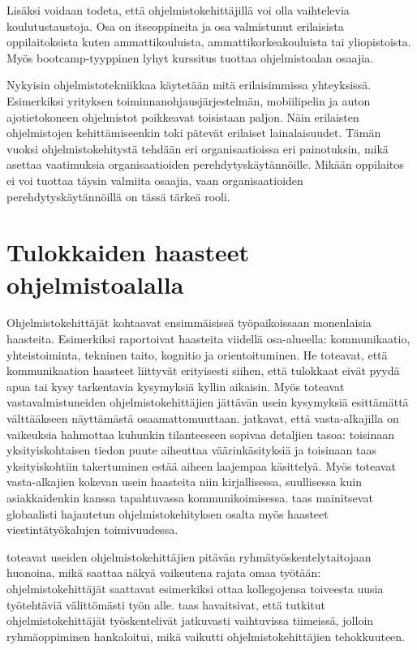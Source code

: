 \documentclass[utf8]{gradu3}
\begin{document}
Lisäksi voidaan todeta, että ohjelmistokehittäjillä voi olla vaihtelevia koulutustaustoja. Osa on itseoppineita ja osa valmistunut erilaisista oppilaitoksista kuten ammattikouluista, ammattikorkeakouluista tai yliopistoista. Myös bootcamp-tyyppinen lyhyt kurssitus tuottaa ohjelmistoalan osaajia. 

Nykyisin ohjelmistotekniikkaa käytetään mitä erilaisimmissa yhteyksissä. Esimerkiksi yrityksen toiminnanohjausjärjestelmän, mobiilipelin ja auton ajotietokoneen ohjelmistot poikkeavat toisistaan paljon. Näin erilaisten ohjelmistojen kehittämiseenkin toki pätevät erilaiset lainalaisuudet. Tämän vuoksi ohjelmistokehitystä tehdään eri organisaatioissa eri painotuksin, mikä asettaa vaatimuksia organisaatioiden perehdytyskäytännöille. Mikään oppilaitos ei voi tuottaa täysin valmiita osaajia, vaan organisaatioiden perehdytyskäytännöillä on tässä tärkeä rooli.

\section{Tulokkaiden haasteet ohjelmistoalalla}
\label{luku-tulokkaiden-haasteet}

Ohjelmistokehittäjät kohtaavat ensimmäisissä työpaikoissaan monenlaisia haasteita. Esimerkiksi \textcite{begel-simon-2008} raportoivat haasteita viidellä osa-alueella: kommunikaatio, yhteistoiminta, tekninen taito, kognitio ja orientoituminen. He toteavat, että kommunikaation haasteet liittyvät erityisesti siihen, että tulokkaat eivät pyydä apua tai kysy tarkentavia kysymyksiä kyllin aikaisin. Myös \textcite{radermacher-ym-2015} toteavat vastavalmistuneiden ohjelmistokehittäjien jättävän usein kysymyksiä esittämättä välttääkseen näyttämästä osaamattomuuttaan. \textcite{begel-simon-2008} jatkavat, että vasta-alkajilla on vaikeuksia hahmottaa kuhunkin tilanteeseen sopivaa detaljien tasoa: toisinaan yksityiskohtaisen tiedon puute aiheuttaa väärinkäsityksiä ja toisinaan taas yksityiskohtiin takertuminen estää aiheen laajempaa käsittelyä. Myös \textcite{radermacher-ym-2015} toteavat vasta-alkajien kokevan usein haasteita niin kirjallisessa, suullisessa kuin asiakkaidenkin kanssa tapahtuvassa kommunikoimisessa. \textcite{moe-ym-2020} taas mainitsevat globaalisti hajautetun ohjelmistokehityksen osalta myös haasteet viestintätyökalujen toimivuudessa.

\textcite{begel-simon-2008} toteavat useiden ohjelmistokehittäjien pitävän ryhmätyöskentelytaitojaan huonoina, mikä saattaa näkyä vaikeutena rajata omaa työtään: ohjelmistokehittäjät saattavat esimerkiksi ottaa kollegojensa toiveesta uusia työtehtäviä välittömästi työn alle. \textcite{britto-ym-2019} taas havaitsivat, että tutkitut ohjelmistokehittäjät työskentelivät jatkuvasti vaihtuvissa tiimeissä, jolloin ryhmäoppiminen hankaloitui, mikä vaikutti ohjelmistokehittäjien tehokkuuteen.
\end{document}
